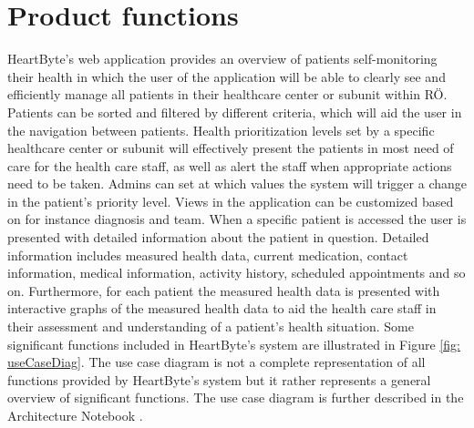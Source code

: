 \documentclass{scrreprt}
\begin{document}
\section{Product functions} 
HeartByte’s web application provides an overview of patients self-monitoring their health in which the user of the application will be able to clearly see and efficiently manage all patients in their healthcare center or subunit within RÖ. Patients can be sorted and filtered by different criteria, which will aid the user in the navigation between patients. Health prioritization levels set by a specific healthcare center or subunit will effectively present the patients in most need of care for the health care staff, as well as alert the staff when appropriate actions need to be taken. Admins can set at which values the system will trigger a change in the patient’s priority level. Views in the application can be customized based on for instance diagnosis and team. When a specific patient is accessed the user is presented with detailed information about the patient in question. Detailed information includes measured health data, current medication, contact information, medical information, activity history, scheduled appointments and so on. Furthermore, for each patient the measured health data is presented with interactive graphs of the measured health data to aid the health care staff in their assessment and understanding of a patient’s health situation. 
\newline
\newline
Some significant functions included in HeartByte’s system are illustrated in Figure \ref{fig: useCaseDiag}. The use case diagram is not a complete representation of all functions provided by HeartByte’s system but it rather represents a general overview of significant functions. The use case diagram is further described in the Architecture Notebook \cite{architecture}.
\end{document}
